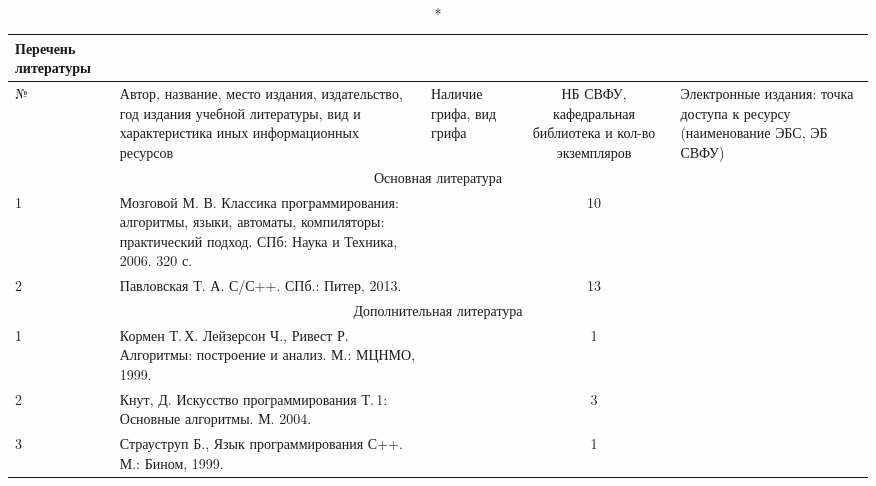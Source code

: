 \documentclass[a4paper,12pt]{article}
\begin{document}
  \begin{longtable}{|l|p{7cm}|p{18mm}|c|p{32mm}|}
  \caption*{Перечень литературы}\\
  \hline
  № & 
  \centering\small\arraybackslash Автор, название, место издания, издательство, год издания учебной литературы, вид и характеристика иных информационных ресурсов &
  \multicolumn{1}{p{18mm}|}{\centering\small\arraybackslash Наличие грифа, вид грифа} &
  \multicolumn{1}{p{21mm}|}{\centering\small\arraybackslash НБ СВФУ, кафедральная библиотека и кол-во экземпляров} & 
  \centering\small\arraybackslash Электронные издания: точка доступа к ресурсу (наименование ЭБС, ЭБ СВФУ)\\
  \hline
  \multicolumn{5}{|c|}{Основная литература}\\
  \hline
  1 &\raggedright\arraybackslash Мозговой М. В. Классика программирования: алгоритмы, языки, автоматы, компиляторы: практический подход. СПб: Наука и Техника, 2006. 320 с.  &   &  10  &  
  \\
  \hline
  2 &\raggedright\arraybackslash Павловская Т. А. С/С++. СПб.: Питер, 2013.  &  & 13 &  
  \\
  \hline
  
  \multicolumn{5}{|c|}{Дополнительная литература}\\
  \hline
  1 &\raggedright\arraybackslash Кормен Т.\,Х. Лейзерсон Ч., Ривест Р. Алгоритмы: построение и анализ. М.: МЦНМО, 1999.  &   &  1  &  
  \\
  \hline
  2 &\raggedright\arraybackslash Кнут, Д. Искусство программирования Т.\,1: Основные алгоритмы. М. 2004.  &   &  3 &  
  \\
  \hline
  3 &\raggedright\arraybackslash Страуструп Б., Язык программирования С++.  М.: Бином, 1999.   &   & 1 & \thispagestyle{empty} 
  \\
  \hline
  
  \end{longtable}
  
\end{document}
